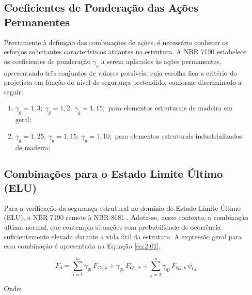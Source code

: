 \subsection{Coeficientes de Ponderação das Ações Permanentes}

Previamente à definição das combinações de ações, é necessário conhecer os esforços solicitantes característicos atuantes na estrutura. A NBR 7190 \parencite{NBR7190-1:2022} estabelece os coeficientes de ponderação $\gamma_{g}$ a serem aplicados às ações permanentes, apresentando três conjuntos de valores possíveis, cuja escolha fica a critério do projetista em função do nível de segurança pretendido, conforme discriminado a seguir:

\begin{enumerate}[label=\alph*)]
    \item $\gamma_{g} = 1,3;\ \gamma_{g} = 1,2;\ \gamma_{g} = 1,15;$ para elementos estruturais de madeira em geral;
    \item $\gamma_{g} = 1,25;\ \gamma_{g} = 1,15;\ \gamma_{g} = 1,10;$ para elementos estruturais industrializados de madeira;
\end{enumerate}

\subsection{Combinações para o Estado Limite Último (ELU)}

Para a verificação da segurança estrutural no domínio do Estado Limite Último (ELU), a NBR 7190 \parencite{NBR7190-1:2022} remete à NBR 8681 \parencite{NBR8681:2025}. Adota-se, nesse contexto, a combinação última normal, que contempla situações com probabilidade de ocorrência suficientemente elevada durante a vida útil da estrutura. A expressão geral para essa combinação é apresentada na Equação \eqref{eq:2.01}.

\begin{equation}
F_d = \sum_{i=1}^{m} \gamma_{gi}\, F_{Gi,k}
      + \gamma_{q1}\, F_{Q1,k}
      + \sum_{j=2}^{n} \gamma_{qj}\, F_{Qj,k}\, \psi_{0j}
       \label{eq:2.01}
\end{equation}

Onde:

